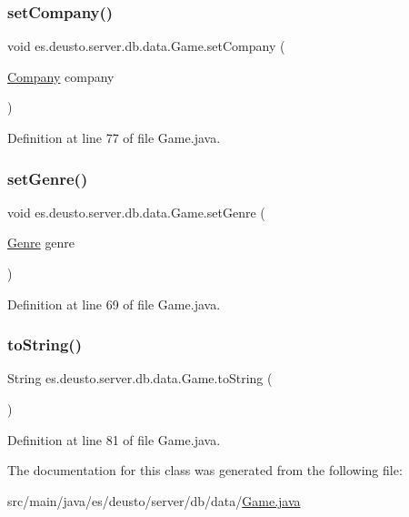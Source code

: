\subsubsection{\texorpdfstring{set\+Company()}{setCompany()}}
{\footnotesize\ttfamily void es.\+deusto.\+server.\+db.\+data.\+Game.\+set\+Company (\begin{DoxyParamCaption}\item[{\hyperlink{classes_1_1deusto_1_1server_1_1db_1_1data_1_1_company}{Company}}]{company }\end{DoxyParamCaption})}



Definition at line 77 of file Game.\+java.

\mbox{\label{classes_1_1deusto_1_1server_1_1db_1_1data_1_1_game_a61d197148280723f018c7ef18e37cb7e}} 
\subsubsection{\texorpdfstring{set\+Genre()}{setGenre()}}
{\footnotesize\ttfamily void es.\+deusto.\+server.\+db.\+data.\+Game.\+set\+Genre (\begin{DoxyParamCaption}\item[{\hyperlink{classes_1_1deusto_1_1server_1_1db_1_1data_1_1_genre}{Genre}}]{genre }\end{DoxyParamCaption})}



Definition at line 69 of file Game.\+java.

\mbox{\label{classes_1_1deusto_1_1server_1_1db_1_1data_1_1_game_aae9eb6e19b8f730b9554cfac23c8298b}} 
\subsubsection{\texorpdfstring{to\+String()}{toString()}}
{\footnotesize\ttfamily String es.\+deusto.\+server.\+db.\+data.\+Game.\+to\+String (\begin{DoxyParamCaption}{ }\end{DoxyParamCaption})}



Definition at line 81 of file Game.\+java.



The documentation for this class was generated from the following file\+:\begin{DoxyCompactItemize}
\item 
src/main/java/es/deusto/server/db/data/\hyperlink{_game_8java}{Game.\+java}\end{DoxyCompactItemize}
